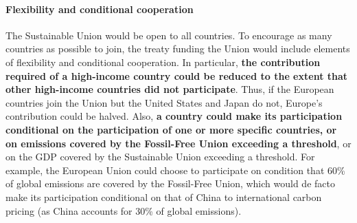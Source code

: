 \documentclass[12pt,english]{article}
\begin{document}
\paragraph{Flexibility and conditional cooperation}
The Sustainable Union would be open to all countries. To encourage as many countries as possible to join, the treaty funding the Union would include elements of flexibility and conditional cooperation. In particular, \textbf{the contribution required of a high-income country could be reduced to the extent that other high-income countries did not participate}. Thus, if the European countries join the Union but the United States and Japan do not, Europe's contribution could be halved. %
Also, %
\textbf{a country could make its participation conditional on the participation of one or more specific countries, or on emissions covered by the Fossil-Free Union exceeding a threshold}, or on the GDP covered by the Sustainable Union exceeding a threshold. For example, the European Union could choose to participate on condition that 60\% of global emissions are covered by the Fossil-Free Union, which would de facto make its participation conditional on that of China to international carbon pricing (as China accounts for 30\% of global emissions). 
\end{document}
